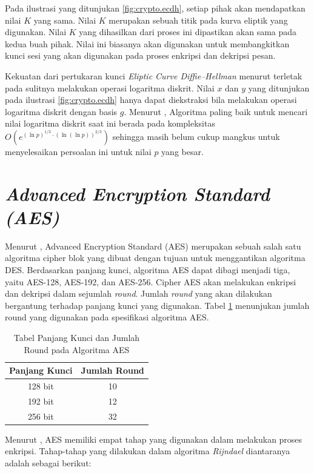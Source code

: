 Pada ilustrasi yang ditunjukan \ref{fig:crypto.ecdh}, setiap pihak akan mendapatkan nilai $K$ yang sama. Nilai $K$ merupakan sebuah titik pada kurva eliptik yang digunakan. Nilai $K$ yang dihasilkan dari proses ini dipastikan akan sama pada kedua buah pihak. Nilai ini biasanya akan digunakan untuk membangkitkan kunci sesi yang akan digunakan pada proses enkripsi dan dekripsi pesan.

Kekuatan dari pertukaran kunci \emph{Eliptic Curve Diffie–Hellman} menurut \textcite{munir2019} terletak pada sulitnya melakukan operasi logaritma diskrit. Nilai $x$ dan $y$ yang ditunjukan pada ilustrasi \ref{fig:crypto.ecdh} hanya dapat diekstraksi bila melakukan operasi logaritma diskrit dengan basis $g$. Menurut \textcite{staling2011}, Algoritma paling baik untuk mencari nilai logaritma diskrit saat ini berada pada kompleksitas $O(e^{(\ln{p})^{1/3} \cdot (\ln{(\ln{p})})^{2/3}})$ sehingga masih belum cukup mangkus untuk menyelesaikan persoalan ini untuk nilai $p$ yang besar.

\section{\emph{Advanced Encryption Standard (AES)}}
Menurut \textcite{staling2011}, Advanced Encryption Standard (AES) merupakan sebuah salah satu algoritma cipher blok yang dibuat dengan tujuan untuk menggantikan algoritma DES. Berdasarkan panjang kunci, algoritma AES dapat dibagi menjadi tiga, yaitu AES-128, AES-192, dan AES-256. Cipher AES akan melakukan enkripsi dan dekripsi dalam sejumlah \emph{round}. Jumlah \emph{round} yang akan dilakukan bergantung terhadap panjang kunci yang digunakan. Tabel \ref{tab:aes-round} menunjukan jumlah round yang digunakan pada spesifikasi algoritma AES.

\begin{longtable}{|c|c|}
  \caption{\label{tab:aes-round} Tabel Panjang Kunci dan Jumlah Round pada Algoritma AES} \\
  \hline
  \textbf{Panjang Kunci} & \textbf{Jumlah Round} \\ \hline
  128 bit       & 10           \\ \hline
  192 bit       & 12           \\ \hline
  256 bit       & 32           \\ \hline
\end{longtable}

Menurut \textcite{staling2011}, AES memiliki empat tahap yang digunakan dalam melakukan proses enkripsi. Tahap-tahap yang dilakukan dalam algoritma \emph{Rijndael} diantaranya adalah sebagai berikut:

